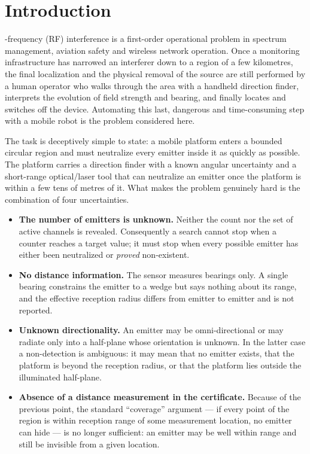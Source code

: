 \documentclass[journal,10pt]{IEEEtran}
\theoremstyle{definition}
\begin{document}
\section{Introduction}

-frequency (RF) interference is a first-order operational problem in
spectrum management, aviation safety and wireless network operation. Once a monitoring
infrastructure has narrowed an interferer down to a region of a few kilometres, the final
localization and the physical removal of the source are still performed by a human operator who
walks through the area with a handheld direction finder, interprets the evolution of field
strength and bearing, and finally locates and switches off the device. Automating this last,
dangerous and time-consuming step with a mobile robot is the problem considered here.

The task is deceptively simple to state: a mobile platform enters a bounded circular region and
must neutralize every emitter inside it as quickly as possible. The platform carries a direction
finder with a known angular uncertainty and a short-range optical/laser tool that can neutralize
an emitter once the platform is within a few tens of metres of it. What makes the problem
genuinely hard is the combination of four uncertainties.

\begin{itemize}
\item \textbf{The number of emitters is unknown.} Neither the count nor the set of active
channels is revealed. Consequently a search cannot stop when a counter reaches a target value;
it must stop when every possible emitter has either been neutralized or \emph{proved}
non-existent.
\item \textbf{No distance information.} The sensor measures bearings only. A single bearing
constrains the emitter to a wedge but says nothing about its range, and the effective reception
radius differs from emitter to emitter and is not reported.
\item \textbf{Unknown directionality.} An emitter may be omni-directional or may radiate only
into a half-plane whose orientation is unknown. In the latter case a non-detection is ambiguous:
it may mean that no emitter exists, that the platform is beyond the reception radius, or that the
platform lies outside the illuminated half-plane.
\item \textbf{Absence of a distance measurement in the certificate.} Because of the previous
point, the standard ``coverage'' argument --- if every point of the region is within reception
range of some measurement location, no emitter can hide --- is no longer sufficient: an emitter
may be well within range and still be invisible from a given location.
\end{itemize}
\end{document}
